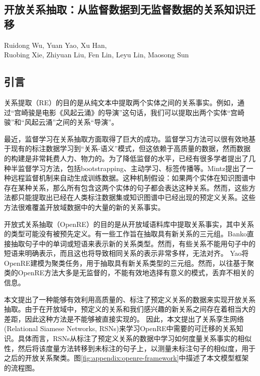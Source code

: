 
\begin{translation}

\section{开放关系抽取：从监督数据到无监督数据的关系知识迁移}
\begin{center}
Ruidong Wu, Yuan Yao, Xu Han, 
\\
Ruobing Xie, Zhiyuan Liu, Fen Lin, Leyu Lin, Maosong Sun	
\end{center}


\subsection{引言}
关系提取（RE）的目的是从纯文本中提取两个实体之间的关系事实。例如，通过“宫崎骏是电影《风起云涌》的导演”这句话，我们可以提取出两个实体“宫崎骏”和“风起云涌”之间的关系“导演”。

最近，监督学习在关系抽取方面取得了巨大的成功。监督学习方法可以很有效地基于现有的标注数据学习到“关系-语义”模式，但这依赖于高质量的数据，然而数据的构建是非常耗费人力、物力的。为了降低监督的水平，已经有很多学者提出了几种半监督学习方法，包括bootstrapping、主动学习、标签传播等。Mintz提出了一种远程监督机制来自动生成训练数据。这种机制假设：如果两个实体在知识图谱中存在某种关系，那么所有包含这两个实体的句子都会表达这种关系。然而，这些方法都只能提取出已经在人类标注数据集或知识图谱中已经出现的预定义关系。这些方法很难覆盖开放域数据中的大量的新的关系事实。

开放式关系抽取（OpenRE）的目的是从开放域语料库中提取关系事实，其中关系的类型可能没有被预先定义。有一些工作旨在抽取具有新关系的三元组。Banko直接抽取句子中的单词或短语来表示新的关系类型。然而，有些关系不能用句子中的短语来明确表示，而且这也将导致相同关系的表示非常多样，无法对齐。 Yao将OpenRE建模为聚类任务，用于抽取具有新关系类型的三元组。然而，以往基于聚类的OpenRE方法大多是无监督的，不能有效地选择有意义的模式，丢弃不相关的信息。

本文提出了一种能够有效利用高质量的、标注了预定义关系的数据来实现开放关系抽取。由于在开放域中，预定义的关系和我们感兴趣的新关系之间存在着相当大的差距，因此这种方法是不能够被直接实现的。
因此，本文提出了关系孪生网络(Relational Siamese Networks, RSNs)来学习OpenRE中需要的可迁移的关系知识。具体而言，RSNs从标注了预定义关系的数据中学习如何度量关系事实的相似性，然后将该度量方法转移到未标注的句子上，以测量未标注句子的相似度，用于之后的开放关系聚类。图\ref{fig:appendix:openre-framework}中描述了本文模型框架的流程图。


\end{translation}
